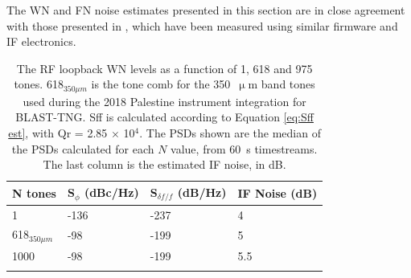 The WN and FN noise estimates presented in this section are in close agreement with those presented in \citet{gordon2016}, which have been measured using similar firmware and IF electronics.

\begin{table}[!htbp]
\centering
\begin{tabular}{@{}llll@{}}
\dtoprule
N tones & S$_{\phi}$ (dBc/Hz) & S$_{\delta f / f}$ (dB/Hz) & IF Noise (dB) \\ \midrule
1 & -136 & -237 & 4 \\
618$_{350\mu m}$ & -98 & -199 & 5 \\
1000 & -98 & -199 & 5.5 \\ \dbottomrule
\\
\end{tabular}
\caption[~RF loopback noise levels for different numbers of probe tones.]{The RF loopback WN levels as a function of 1, 618 and 975 tones. 618$_{350\mu m}$ is the tone comb for the 350~$\upmu$m band tones used during the 2018 Palestine instrument integration for BLAST-TNG. \gls{Sff} is calculated according to Equation \ref{eq:Sff est}, with \gls{Qr} = 2.85 $\times$ 10$^{4}$. The PSDs shown are the median of the PSDs calculated for each $N$ value, from 60~s timestreams. The last column is the estimated IF noise, in dB.}
\label{tab:rf loopback}
\end{table}


